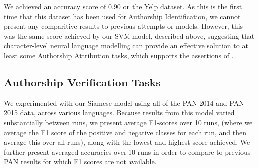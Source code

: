 We achieved an accuracy score of 0.90 on the Yelp dataset. As this is the first time that this dataset has been used for Authorship Identification, we cannot present any comparitive results to previous attempts or models. However, this was the same score achieved by our SVM model, described above, suggesting that character-level neural language modelling can provide an effective solution to at least some Authorship Attribution tasks, which supports the assertions of \citet{bagnall2015author}. 

\subsection{Authorship Verification Tasks}
\label{res:siamese}

We experimented with our Siamese model using all of the PAN 2014 and PAN 2015 data, across various languages. Because results from this model varied substantially between runs, we present average F1-scores over 10 runs, (where we average the F1 score of the positive and negative classes for each run, and then average this over all runs),
along with the lowest and highest score achieved. We further present averaged accuracies over 10 runs in order to compare to previous PAN results for which F1 scores are not available.


